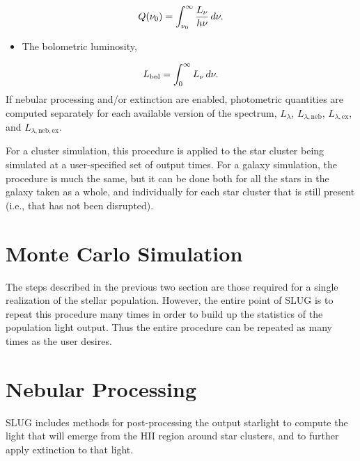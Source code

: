\documentclass[letterpaper,10pt,english]{sphinxmanual}
\begin{document}
\begin{gather}
\begin{split}Q(\nu_0) = \int_{\nu_0}^\infty \frac{L_\nu}{h\nu} \, d\nu.\end{split}\notag
\end{gather}\begin{itemize}
\item {} 
The bolometric luminosity,

\end{itemize}
\begin{gather}
\begin{split}L_{\rm bol} = \int_0^\infty L_\nu \, d\nu.\end{split}\notag
\end{gather}
If nebular processing and/or extinction are enabled, photometric quantities are computed separately for each available version of the spectrum, \(L_\lambda\), \(L_{\lambda,\mathrm{neb}}\), \(L_{\lambda,\mathrm{ex}}\), and \(L_{\lambda,\mathrm{neb,ex}}\).

For a cluster simulation, this procedure is applied to the star cluster being simulated at a user-specified set of output times. For a galaxy simulation, the procedure is much the same, but it can be done both for all the stars in the galaxy taken as a whole, and individually for each star cluster that is still present (i.e., that has not been disrupted).


\section{Monte Carlo Simulation}
\label{intro:monte-carlo-simulation}
The steps described in the previous two section are those required for a single realization of the stellar population. However, the entire point of SLUG is to repeat this procedure many times in order to build up the statistics of the population light output. Thus the entire procedure can be repeated as many times as the user desires.


\section{Nebular Processing}
\label{intro:ssec-nebula}\label{intro:nebular-processing}
SLUG includes methods for post-processing the output starlight to compute the light that will emerge from the HII region around star clusters, and to further apply extinction to that light.
\end{document}
